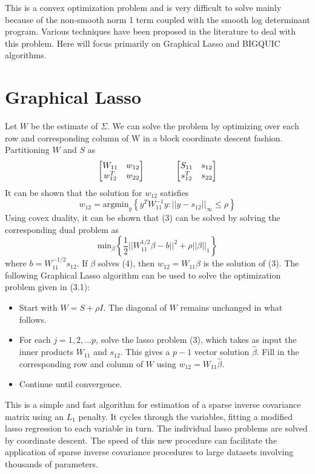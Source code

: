 \documentclass[12pt]{article}
\begin{document}
This is a convex optimization problem and is very difficult to solve mainly because of the non-smooth norm 1 term coupled with the smooth log determinant program. Various techniques have been proposed in the literature to deal with this problem. Here will focus primarily on Graphical Lasso and BIGQUIC algorithms.


\section{Graphical Lasso}
Let $W$ be the estimate of $\Sigma$. We can solve the problem by optimizing over each row and corresponding column of W in a block coordinate descent fashion.\cite{banerjee2008model}\cite{friedman2008sparse} Partitioning $W$ and $S$ as \[\begin{bmatrix}W_{11}& w_{12} \\w_{12}^T & w_{22}\end{bmatrix}\hspace{0.5in}\begin{bmatrix}S_{11}& s_{12} \\s_{12}^T & s_{22}\end{bmatrix}\] It can be shown that the solution for $w_{12}$ satisfies
\begin{equation}
w_{12} = \text{argmin}_y\left\{ y^TW_{11}^{-1}y : ||y-s_{12}||_{\infty} \leq \rho\right\}
\end{equation}
Using covex duality, it can be shown that (3) can be solved by solving the corresponding dual problem as 
\begin{equation}
\text{min}_\beta\left\{\dfrac{1}{2}||W_{11}^{1/2}\beta-b||^2+\rho||\beta||_1\right\}
\end{equation}
where $b=W_{11}^{-1/2}s_{12}$. If $\beta$ solves (4), then $w_{12}=W_{11}\beta$ is the solution of (3). 
The following Graphical Lasso algorithm\cite{friedman2008sparse} can be used to solve the optimization problem given in (3.1):
\begin{itemize}
\item Start with $W = S +\rho I$. The diagonal of $W$ remains unchanged
in what follows.
\item For each $j = 1, 2, . . . p$, solve the lasso problem (3), which takes as input the inner products $W_{11}$ and $s_{12}$. This gives a $p-1$ vector solution $\hat{\beta}$. Fill in the corresponding row and column of $W$ using $w_{12} = W_{11}\hat{\beta}$.
\item Continue until convergence.
\end{itemize}
This is a simple and fast algorithm for estimation of a sparse inverse covariance matrix using an $L_1$ penalty. It cycles through the variables, fitting a modified lasso regression to each variable in turn. The individual lasso problems are solved by coordinate descent. The speed of this new procedure can facilitate the application of sparse inverse covariance procedures to large datasets involving thousands of parameters.\cite{friedman2008sparse}
\end{document}

